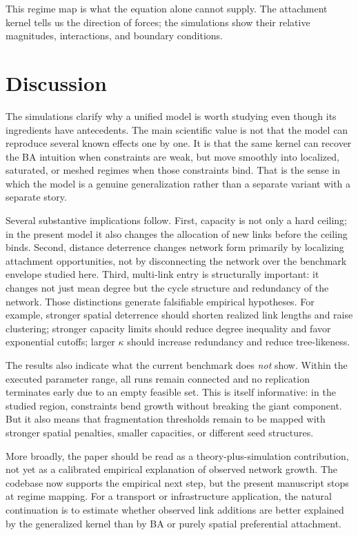 \documentclass[11pt]{article}
\begin{document}
This regime map is what the equation alone cannot supply. The attachment kernel tells us the direction of forces; the simulations show their relative magnitudes, interactions, and boundary conditions.

\section{Discussion}
\label{sec:discussion}

The simulations clarify why a unified model is worth studying even though its ingredients have antecedents. The main scientific value is not that the model can reproduce several known effects one by one. It is that the same kernel can recover the BA intuition when constraints are weak, but move smoothly into localized, saturated, or meshed regimes when those constraints bind. That is the sense in which the model is a genuine generalization rather than a separate variant with a separate story.

Several substantive implications follow. First, capacity is not only a hard ceiling; in the present model it also changes the allocation of new links before the ceiling binds. Second, distance deterrence changes network form primarily by localizing attachment opportunities, not by disconnecting the network over the benchmark envelope studied here. Third, multi-link entry is structurally important: it changes not just mean degree but the cycle structure and redundancy of the network. Those distinctions generate falsifiable empirical hypotheses. For example, stronger spatial deterrence should shorten realized link lengths and raise clustering; stronger capacity limits should reduce degree inequality and favor exponential cutoffs; larger $\kappa$ should increase redundancy and reduce tree-likeness.

The results also indicate what the current benchmark does \emph{not} show. Within the executed parameter range, all runs remain connected and no replication terminates early due to an empty feasible set. This is itself informative: in the studied region, constraints bend growth without breaking the giant component. But it also means that fragmentation thresholds remain to be mapped with stronger spatial penalties, smaller capacities, or different seed structures.

More broadly, the paper should be read as a theory-plus-simulation contribution, not yet as a calibrated empirical explanation of observed network growth. The codebase now supports the empirical next step, but the present manuscript stops at regime mapping. For a transport or infrastructure application, the natural continuation is to estimate whether observed link additions are better explained by the generalized kernel than by BA or purely spatial preferential attachment.
\end{document}
